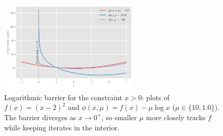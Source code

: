 \begin{figure}[H]
    \centering
    \includegraphics[width=0.6\textwidth]{figs/optimization/barrier.pdf}
    \caption{Logarithmic barrier for the constraint $x>0$: plots of $f(x)=(x-2)^2$ and $\phi(x,\mu)=f(x)-\mu\log x$ ($\mu\in\{10,1.0\}$). The barrier diverges as $x\to0^+$, so smaller $\mu$ more closely tracks $f$ while keeping iterates in the interior.}
    \label{fig:barrier}
\end{figure}


